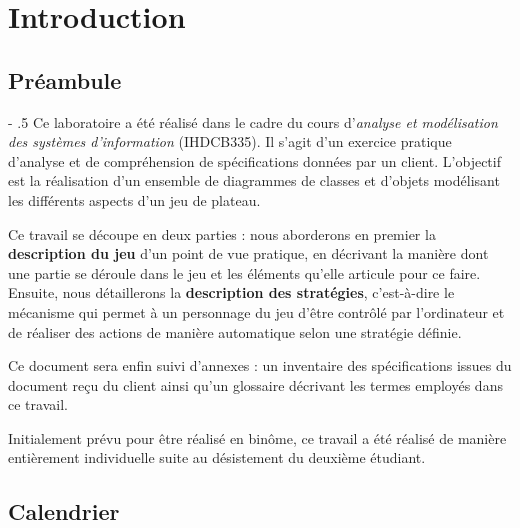 \documentclass[oneside,a4paper]{book}
\makeatletter
\renewcommand\paragraph{%
    \@startsection{paragraph}{4}{0mm}%
       {-\baselineskip}%
       {.5\baselineskip}%
       {\normalfont\normalsize\bfseries}}
\makeatother
\begin{document}
\tableofcontents

\chapter*{Introduction}
\section*{Préambule}
\paragraph{}
Ce laboratoire a été réalisé dans le cadre du cours d'\textit{analyse et modélisation des systèmes d'information} (IHDCB335). Il s'agit d'un exercice pratique d'analyse et de compréhension de spécifications données par un client. L'objectif est la réalisation d'un ensemble de diagrammes de classes et d'objets modélisant les différents aspects d'un jeu de plateau.\newline

Ce travail se découpe en deux parties : nous aborderons en premier la \textbf{description du jeu} d'un point de vue pratique, en décrivant la manière dont une partie se déroule dans le jeu et les éléments qu'elle articule pour ce faire. Ensuite, nous détaillerons la \textbf{description des stratégies}, c'est-à-dire le mécanisme qui permet à un personnage du jeu d'être contrôlé par l'ordinateur et de réaliser des actions de manière automatique selon une stratégie définie.\newline

Ce document sera enfin suivi d'annexes : un inventaire des spécifications issues du document reçu du client ainsi qu'un glossaire décrivant les termes employés dans ce travail.

\begin{tcolorbox}
    Initialement prévu pour être réalisé en binôme, ce travail a été réalisé de manière entièrement individuelle suite au désistement du deuxième étudiant.
\end{tcolorbox}

\section*{Calendrier}
\end{document}
